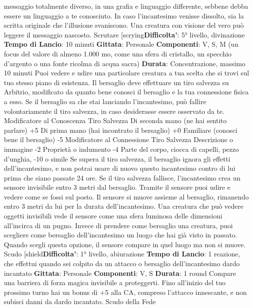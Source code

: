 \begin{multicols}{2}
messaggio totalmente diverso, in una grafia e
linguaggio differente, sebbene debba essere un
linguaggio a te conosciuto.
In caso l’incantesimo venisse dissolto, sia la scritta
originale che l’illusione svaniscono.
Una creatura con visione del vero può leggere il
messaggio nascosto.
Scrutare
[scrying\textbf{Difficolta'}:
5° livello, divinazione
\textbf{Tempo di Lancio}: 10 minuti
\textbf{Gittata}: Personale
\textbf{Componenti}: V, S, M (un focus del valore di almeno
1.000 mo, come una sfera di cristallo, un specchio
d’argento o una fonte ricolma di acqua sacra)
\textbf{Durata}: Concentrazione, massimo 10 minuti
Puoi vedere e udire una particolare creatura a tua
scelta che si trovi sul tuo stesso piano di esistenza. Il
bersaglio deve effettuare un tiro salvezza su Arbitrio,
modificato da quanto bene conosci il bersaglio e la tua
connessione fisica a esso. Se il bersaglio sa che stai
lanciando l’incantesimo, può fallire volontariamente il
tiro salvezza, in caso desiderasse essere osservato da
te.
Modificatore al
Conoscenza Tiro Salvezza
Di seconda mano (ne hai sentito parlare) +5
Di prima mano (hai incontrato il bersaglio) +0
Familiare (conosci bene il bersaglio) -5
Modificatore al
Connessione Tiro Salvezza
Descrizione o immagine -2
Proprietà o indumento -4
Parte del corpo, ciocca di capelli, pezzo d’unghia, -10
o simile
Se supera il tiro salvezza, il bersaglio ignora gli effetti
dell’incantesimo, e non potrai usare di nuovo questo
incantesimo contro di lui prima che siano passate 24
ore.
Se il tiro salvezza fallisce, l’incantesimo crea un
sensore invisibile entro 3 metri dal bersaglio. Tramite il
sensore puoi udire e vedere come se fossi sul posto. Il
sensore si muove assieme al bersaglio, rimanendo
entro 3 metri da lui per la durata dell’incantesimo. Una
creatura che può vedere oggetti invisibili vede il 
sensore come una sfera luminosa delle dimensioni
all’incirca di un pugno.
Invece di prendere come bersaglio una creatura, puoi
scegliere come bersaglio dell’incantesimo un luogo che
hai già visto in passato. Quando scegli questa opzione,
il sensore compare in quel luogo ma non si muove.
Scudo
[shield\textbf{Difficolta'}:
1° livello, abiurazione
\textbf{Tempo di Lancio}: 1 reazione, che effettui quando sei
colpito da un attacco o bersaglio dell’incantesimo dardo
incantato
\textbf{Gittata}: Personale
\textbf{Componenti}: V, S
\textbf{Durata}: 1 round
Compare una barriera di forza magica invisibile a
proteggerti. Fino all’inizio del tuo prossimo turno hai un
bonus di +5 alla CA, compreso l’attacco innescante, e
non subisci danni da dardo incantato.
Scudo della Fede

\end{multicols}

